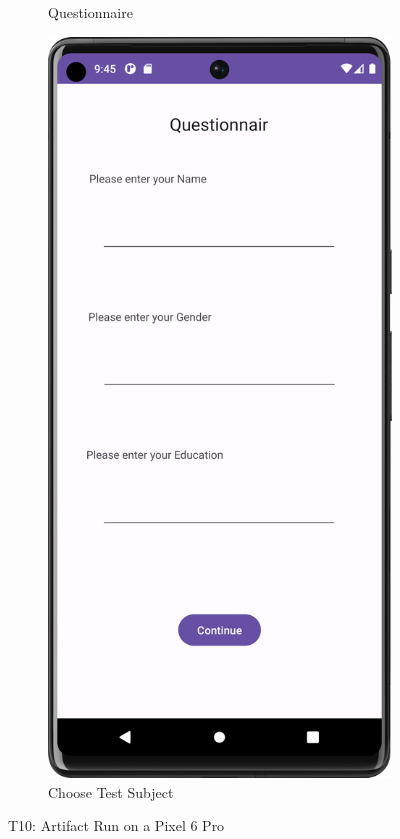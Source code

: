 \begin{figure}[htbp]
\begin{subfigure}[b]{0.25\textwidth}
        \caption{Questionnaire} %
        \label{subfig:QuestionairPixel}
    \end{subfigure}
        \hspace{1cm}
    \begin{subfigure}[b]{0.25\textwidth}
        \centering
        \includegraphics[width=\textwidth]{content/07_evaluation_of_the_solution/Screenshot_T10c.png}
        \caption{Choose Test Subject}
        \label{subfig:chooseTestSubjectPixel}
    \end{subfigure}
       \caption{T10: Artifact Run on a Pixel 6 Pro}
       \label{fig:uiScreensPixel6}
\end{figure}

